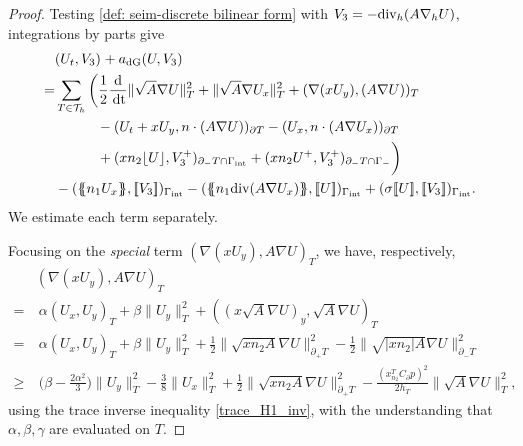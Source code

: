 \documentclass{amsart}
\newcommand{\norm}[2]{\|{#1}\|_{{#2}}}
\newcommand{\jump}[1]{[\kern-0.6mm [{#1}]\kern-0.6mm]}
\newcommand{\av}[1]{\{\kern-1.2mm \{{#1}\}\kern-1.2mm\}}
\newcommand{\dee}{{\rm d}}
\newcommand{\inner}[3]{({#1},{#2})_{{#3}}}
\newcommand{\Th}{\mathcal{T}_h}
\newcommand{\gint}{\Gamma_{\rm int}}
\newcommand{\gif}{\Gamma_-}
\newcommand{\Div}{{\rm div}}
\newcommand{\cinvT}{C_{\partial}}
\newcommand{\normal}{{n}}
\newcommand{\jumpu}[1]{ \lfloor #1 \rfloor }
\newcommand{\avg }[1]{ \av{ #1}}
\newcommand{\dt}{\,{\rm dt}}
\newcommand{\xn}{x_{n_2}^{T}}
\theoremstyle{definition}
\theoremstyle{remark}
\numberwithin{equation}{section}
\begin{document}
\begin{proof}


	Testing \eqref{def: seim-discrete bilinear form} with $V_3 = -\Div_h(A \nabla_h U)$, integrations by parts give
	\begin{equation*}\begin{split}
		&	  \inner{U_t}{V_3}{}  +    a_{\rm dG}(U,V_3)
			  \\
			    =&
			\sum_{T \in \Th} \bigg(
			\frac{1}{2} \frac{\dee}{\dt} \norm{\sqrt{A} \nabla U}{T}^2
			+
			\norm{\sqrt{A}\nabla U_x}{T}^2	+
			\inner{\nabla (x U_y)}{(A\nabla U)}{T}
			\\
			&\qquad\quad
			-
			\inner{U_t+ x U_y}{\normal \cdot (A\nabla U)}{\partial T}
			-
			\inner{U_x}{\normal \cdot (A\nabla U_x)}{\partial T}		\\
			&\qquad\quad
			+
			\inner{x\normal_2 \jumpu{U}}{ V_3^+ }{\partial_- T \cap \gint}
			+
			\inner{x\normal_2 U^+}{V_3^+}{\partial_- T \cap \gif}
			\bigg)
			\\
			&-
			\inner{\avg{\normal_1 U_x}}{\jump{ V_3}}{\gint }
			-
			\inner{\avg{\normal_1 \Div(A\nabla U_x) }}{\jump{U}}{\gint }
			+
			\inner{\sigma \jump{U}}{\jump{V_3}}{\gint }.
	\end{split}\end{equation*}
We estimate each term separately.

Focusing on the \emph{special} term $	\inner{\nabla(x U_y)}{A \nabla U}{T}$, we have, respectively,
	\begin{equation*}
		\begin{aligned}
	&	\inner{\nabla(x U_y)}{A \nabla U}{T}\\
		=&\
		 \alpha \inner{U_x}{U_y}{T}
		 +
		 \beta \norm{U_y}{T}^2
		 +
		 \inner{(x\sqrt{A} \nabla U)_y}{ \sqrt{A} \nabla U}{T}\\
		 =&\
		\alpha \inner{U_x}{U_y}{T}
		+
		\beta \norm{U_y}{T}^2
		+
		\frac{1}{2} \norm{ \sqrt{x\normal_2 A}\nabla U }{\partial_+ T}^2
		-
		\frac{1}{2} \norm{ \sqrt{|x\normal_2| A}\nabla U }{\partial_- T}^2\\
		\ge & \
	 \Big(\beta-\frac{2\alpha^2}{3}\Big)\norm{U_y}{T}^2	-	\frac{3}{8} \norm{U_x}{T} ^2+	\frac{1}{2} \norm{ \sqrt{x\normal_2 A}\nabla U }{\partial_+ T}^2
	 - \frac{(\xn\cinvT p)^2}{2h_T} \norm{\sqrt{A}\nabla U }{T}^2,
		\end{aligned}
	\end{equation*}
using the trace inverse inequality \eqref{trace_H1_inv}, with the understanding that $\alpha,\beta,\gamma$ are evaluated on $T$.



\end{proof}
\end{document}
